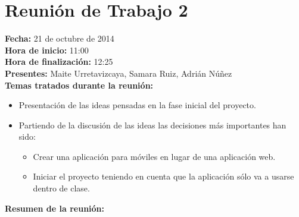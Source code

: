 \section*{Reunión de Trabajo 2}

\textbf{Fecha:} 21 de octubre de 2014\\

\textbf{Hora de inicio:} 11:00\\

\textbf{Hora de finalización:} 12:25\\

\textbf{Presentes:} Maite Urretavizcaya, Samara Ruiz, Adrián Núñez\\

\textbf{Temas tratados durante la reunión:}

\begin{itemize}
\item Presentación de las ideas pensadas en la fase inicial del proyecto.
\item Partiendo de la discusión de las ideas las decisiones más importantes han sido:
\begin{itemize}
	\item Crear una aplicación para móviles en lugar de una aplicación web.
	\item Iniciar el proyecto teniendo en cuenta que la aplicación sólo va a usarse dentro de clase.
\end{itemize}
\end{itemize}

\textbf{Resumen de la reunión:}

